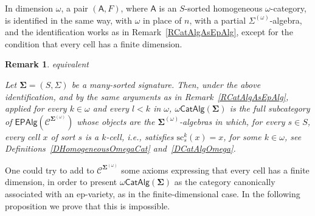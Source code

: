 \documentclass[a4paper, reqno]{amsbook}
\makeatletter
\newcommand{\sig}[1]{\mathbf{#1}}             %
\newcommand{\spec}[1]{\boldsymbol{\mathcal{#1}}} %
\newcommand{\src}{\mathrm{sc}}
\theoremstyle{plain}
\newtheorem{remark}[theorem]{Remark}
\theoremstyle{definition}
\newcommand*{\CA@leanpending}{}
\newcommand*{\CA@leanrelation}{}
\newcommand*{\lean}[2]{%
  \ifcsname\string\color@lean@#1\endcsname\else
    \PackageError{main}{Unknown relation `#1' in \string\lean}{Use equivalent, weaker or stronger.}%
  \fi
  \gdef\CA@leanrelation{#1}%
  \gdef\CA@leanpending{#2}}
\makeatother
\begin{document}
In dimension $\omega$, a pair $(\mathsf{A},F)$, where $\mathsf{A}$ is an $S$-sorted homogeneous $\omega$-category, is identified in the same way, with $\omega$ in place of $n$, with a partial $\Sigma^{(\omega)}$-algebra, and the identification works as in Remark~\ref{RCatAlgAsEpAlg}, except for the condition that every cell has a finite dimension.

\begin{remark}\label{RCatAlgAsEpAlgOmega}\lean{equivalent}{Homogeneous.omegaModelIsomorphism}
Let $\sig{\Sigma}=(S,\Sigma)$ be a many-sorted signature.
Then, under the above identification, and by the same arguments as in Remark~\ref{RCatAlgAsEpAlg}, applied for every $k\in\omega$ and every $l<k$ in $\omega$, $\omega\mathsf{CatAlg}(\sig{\Sigma})$ is the full subcategory of $\mathsf{EPAlg}(\spec{C}^{\sig{\Sigma}^{(\omega)}})$ whose objects are the $\sig{\Sigma}^{(\omega)}$-algebras in which, for every $s\in S$, every cell $x$ of sort $s$ is a $k$-cell, i.e., satisfies $\src^{k}_{s}(x)=x$, for some $k\in\omega$, see Definitions~\ref{DHomogeneousOmegaCat} and~\ref{DCatAlgOmega}.
\end{remark}

One could try to add to $\mathcal{C}^{\sig{\Sigma}^{(\omega)}}$ some axioms expressing that every cell has a finite dimension, in order to present $\omega\mathsf{CatAlg}(\sig{\Sigma})$ as the category canonically associated with an ep-variety, as in the finite-dimensional case.
In the following proposition we prove that this is impossible.
\end{document}
